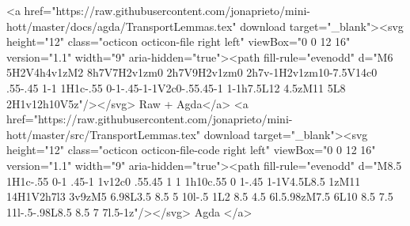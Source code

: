 {{        <a href="https://raw.githubusercontent.com/jonaprieto/mini-hott/master/docs/agda/TransportLemmas.tex" download target="_blank"><svg height="12" class="octicon octicon-file right left" viewBox="0 0 12 16" version="1.1" width="9" aria-hidden="true"><path fill-rule="evenodd" d="M6 5H2V4h4v1zM2 8h7V7H2v1zm0 2h7V9H2v1zm0 2h7v-1H2v1zm10-7.5V14c0 .55-.45 1-1 1H1c-.55 0-1-.45-1-1V2c0-.55.45-1 1-1h7.5L12 4.5zM11 5L8 2H1v12h10V5z"/></svg> Raw + Agda</a>
        <a href="https://raw.githubusercontent.com/jonaprieto/mini-hott/master/src/TransportLemmas.tex" download target="_blank"><svg height="12" class="octicon octicon-file-code right left" viewBox="0 0 12 16" version="1.1" width="9" aria-hidden="true"><path fill-rule="evenodd" d="M8.5 1H1c-.55 0-1 .45-1 1v12c0 .55.45 1 1 1h10c.55 0 1-.45 1-1V4.5L8.5 1zM11 14H1V2h7l3 3v9zM5 6.98L3.5 8.5 5 10l-.5 1L2 8.5 4.5 6l.5.98zM7.5 6L10 8.5 7.5 11l-.5-.98L8.5 8.5 7 7l.5-1z"/></svg> Agda </a>
      
}}
